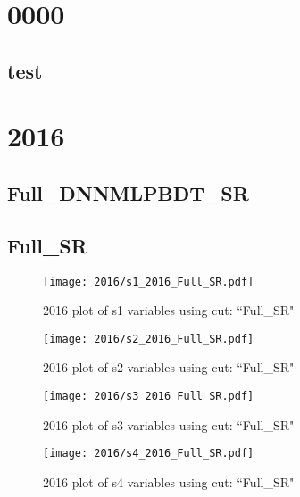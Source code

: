\documentclass{article}
\begin{document}
    \graphicspath{ {../../plots/} }
    \listoffigures
    \section*{0000}
      \subsection*{test}
    \section*{2016}
      \subsection*{Full\_DNNMLPBDT\_SR}
      \subsection*{Full\_SR}
                        \begin{figure}[H]
                            \centering
                            \caption{2016 plot of s1 variables using cut: ``Full\_SR"}
                            \texttt{[image: 2016/s1\_2016\_Full\_SR.pdf]}
                        \end{figure}    
                        \begin{figure}[H]
                            \centering
                            \caption{2016 plot of s2 variables using cut: ``Full\_SR"}
                            \texttt{[image: 2016/s2\_2016\_Full\_SR.pdf]}
                        \end{figure}    
                        \begin{figure}[H]
                            \centering
                            \caption{2016 plot of s3 variables using cut: ``Full\_SR"}
                            \texttt{[image: 2016/s3\_2016\_Full\_SR.pdf]}
                        \end{figure}    
                        \begin{figure}[H]
                            \centering
                            \caption{2016 plot of s4 variables using cut: ``Full\_SR"}
                            \texttt{[image: 2016/s4\_2016\_Full\_SR.pdf]}
                        \end{figure}    
\end{document}
